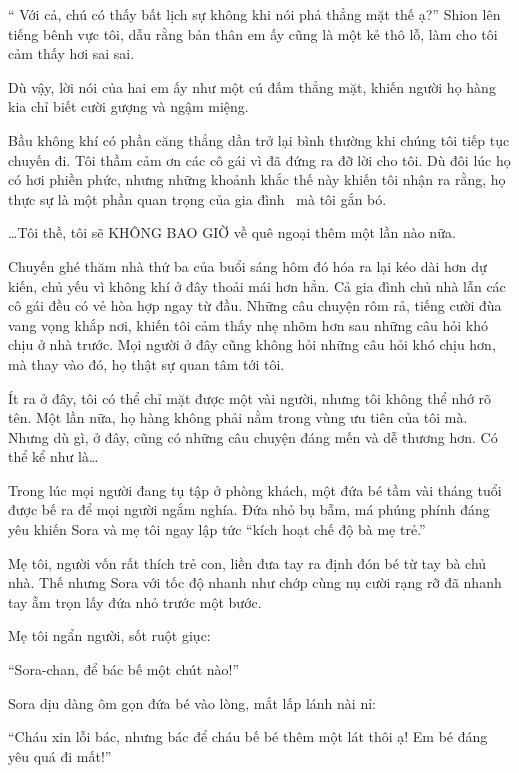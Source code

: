 \documentclass[../main.tex]{subfiles}
\begin{document}
``{\color{red} Với cả, chú có thấy bất lịch sự không khi nói phả thẳng mặt thế ạ?}'' Shion lên tiếng bênh vực tôi, dẫu rằng bản thân em ấy cũng là một kẻ thô lỗ, làm cho tôi cảm thấy hơi sai sai.

Dù vậy, lời nói của hai em ấy như một cú đấm thẳng mặt, khiến người họ hàng kia chỉ biết cười gượng và ngậm miệng.

\il

Bầu không khí có phần căng thẳng dần trở lại bình thường khi chúng tôi tiếp tục chuyến đi. Tôi thầm cảm ơn các cô gái vì đã đứng ra đỡ lời cho tôi. Dù đôi lúc họ có hơi phiền phức, nhưng những khoảnh khắc thế này khiến tôi nhận ra rằng, họ thực sự là một phần quan trọng của gia đình \hll\ mà tôi gắn bó.

\dots Tôi thề, tôi sẽ KHÔNG BAO GIỜ về quê ngoại thêm một lần nào nữa.

\ct

Chuyến ghé thăm nhà thứ ba của buổi sáng hôm đó hóa ra lại kéo dài hơn dự kiến, chủ yếu vì không khí ở đây thoải mái hơn hẳn. Cả gia đình chủ nhà lẫn các cô gái đều có vẻ hòa hợp ngay từ đầu. Những câu chuyện rôm rả, tiếng cười đùa vang vọng khắp nơi, khiến tôi cảm thấy nhẹ nhõm hơn sau những câu hỏi khó chịu ở nhà trước. Mọi người ở đây cũng không hỏi những câu hỏi khó chịu hơn, mà thay vào đó, họ thật sự quan tâm tới tôi.

Ít ra ở đây, tôi có thể chỉ mặt được một vài người, nhưng tôi không thể nhớ rõ tên. Một lần nữa, họ hàng không phải nằm trong vùng ưu tiên của tôi mà. Nhưng dù gì, ở đây, cũng có những câu chuyện đáng mến và dễ thương hơn. Có thể kể như là\dots

\il

Trong lúc mọi người đang tụ tập ở phòng khách, một đứa bé tầm vài tháng tuổi được bế ra để mọi người ngắm nghía. Đứa nhỏ bụ bẫm, má phúng phính đáng yêu khiến Sora và mẹ tôi ngay lập tức ``kích hoạt chế độ bà mẹ trẻ.''

Mẹ tôi, người vốn rất thích trẻ con, liền đưa tay ra định đón bé từ tay bà chủ nhà. Thế nhưng Sora với tốc độ nhanh như chớp cùng nụ cười rạng rỡ đã nhanh tay ẵm trọn lấy đứa nhỏ trước một bước.

Mẹ tôi ngẩn người, sốt ruột giục:

``Sora-chan, để bác bế một chút nào!''

Sora dịu dàng ôm gọn đứa bé vào lòng, mắt lấp lánh nài nỉ:

``Cháu xin lỗi bác, nhưng bác để cháu bế bé thêm một lát thôi ạ! Em bé đáng yêu quá đi mất!''
\end{document}
